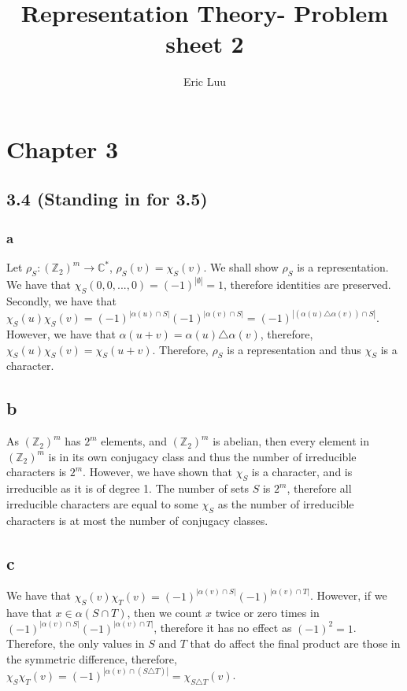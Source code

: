 \documentclass[]{article}
\title{Representation Theory- Problem sheet 2}
\author{Eric Luu}
\begin{document}
\maketitle

\section*{Chapter 3}
\subsection*{3.4 (Standing in for 3.5)}
\subsubsection*{a}
Let $\rho_S : (\mathbb{Z}_2)^m \rightarrow \mathbb{C}^*$, $\rho_S(v) = \chi_S(v)$. We shall show $\rho_S$ is a representation. We have that $\chi_S(0, 0, ..., 0) = (-1)^{|\emptyset|} = 1$, therefore identities are preserved. Secondly, we have that $\chi_S(u)\chi_S(v) = (-1)^{|\alpha(u) \cap S|}(-1)^{|\alpha(v) \cap S|} = (-1)^{|(\alpha(u) \triangle \alpha(v)) \cap S|}$. However, we have that $\alpha(u + v) = \alpha(u) \triangle \alpha(v)$, therefore, $\chi_S(u)\chi_S(v) = \chi_S(u + v)$. Therefore, $\rho_S$ is a representation and thus $\chi_S$ is a character.
\subsection*{b}
As $(\mathbb{Z}_2)^m$ has $2^m$ elements, and $(\mathbb{Z}_2)^m$ is abelian, then every element in $(\mathbb{Z}_2)^m$ is in its own conjugacy class and thus the number of irreducible characters is $2^m$. However, we have shown that $\chi_S$ is a character, and is irreducible as it is of degree 1. The number of sets $S$ is $2^m$, therefore all irreducible characters are equal to some $\chi_S$ as the number of irreducible characters is at most the number of conjugacy classes.
\subsection*{c}
We have that $\chi_S(v) \chi_T(v) = (-1)^{|\alpha(v) \cap S|}(-1)^{|\alpha(v) \cap T|}$. However, if we have that $x \in \alpha(S \cap T)$, then we count $x$ twice or zero times in $(-1)^{|\alpha(v) \cap S|}(-1)^{|\alpha(v) \cap T|}$, therefore it has no effect as $(-1)^2 = 1$. Therefore, the only values in $S$ and $T$ that do affect the final product are those in the symmetric difference, therefore, $\chi_S\chi_T(v) = (-1)^{|\alpha(v) \cap (S \triangle T)|} = \chi_{S \triangle T}(v)$. 
\end{document}

